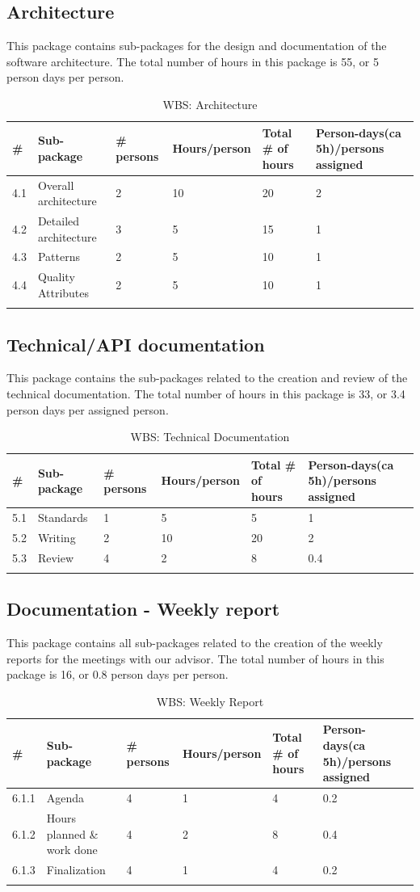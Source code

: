 \subsection{Architecture}
This package contains sub-packages for the design and documentation of the software architecture. The total number of hours in this package is 55, or 5 person days per person.
\begin{longtable}{|p{0.7cm}|p{3cm}|p{1.8cm}|p{2.5cm}|p{2cm}|p{2.8cm}|}
\hline
\# & Sub-package & \# persons & Hours/person & Total \# of hours & Person-days(ca 5h)/persons assigned\\ 
\hline
4.1 & Overall architecture & 2 & 10 & 20 & 2\\ 
\hline
4.2 & Detailed architecture & 3 & 5 & 15 & 1\\ 
\hline
4.3 & Patterns & 2 & 5 & 10 & 1\\ 
\hline
4.4 & Quality Attributes & 2 & 5 & 10 & 1\\ 
\hline
\caption{WBS: Architecture}
\end{longtable}

\subsection{Technical/API documentation}
This package contains the sub-packages related to the creation and review of the technical documentation. The total number of hours in this package is 33, or 3.4 person days per assigned person.
\begin{longtable}{|p{0.7cm}|p{3cm}|p{1.8cm}|p{2.5cm}|p{2cm}|p{2.8cm}|}
\hline
\# & Sub-package & \# persons & Hours/person & Total \# of hours & Person-days(ca 5h)/persons assigned\\ 
\hline
5.1 & Standards & 1 & 5 & 5 & 1\\ 
\hline
5.2 & Writing & 2 & 10 & 20 & 2\\ 
\hline
5.3 & Review & 4 & 2 & 8 & 0.4\\ 
\hline
\caption{WBS: Technical Documentation}
\end{longtable}

\newpage
\subsection{Documentation - Weekly report}
This package contains all sub-packages related to the creation of the weekly reports for the meetings with our advisor. The total number of hours in this package is 16, or 0.8 person days per person.
\begin{longtable}{|p{0.7cm}|p{3cm}|p{1.8cm}|p{2.5cm}|p{2cm}|p{2.8cm}|}
\hline
\# & Sub-package & \# persons & Hours/person & Total \# of hours & Person-days(ca 5h)/persons assigned\\ 
\hline
6.1.1 & Agenda & 4 & 1 & 4 & 0.2\\ 
\hline
6.1.2 & Hours planned \& work done & 4 & 2 & 8 & 0.4\\ 
\hline
6.1.3 & Finalization & 4 & 1 & 4 & 0.2\\ 
\hline
\caption{WBS: Weekly Report}
\end{longtable}

